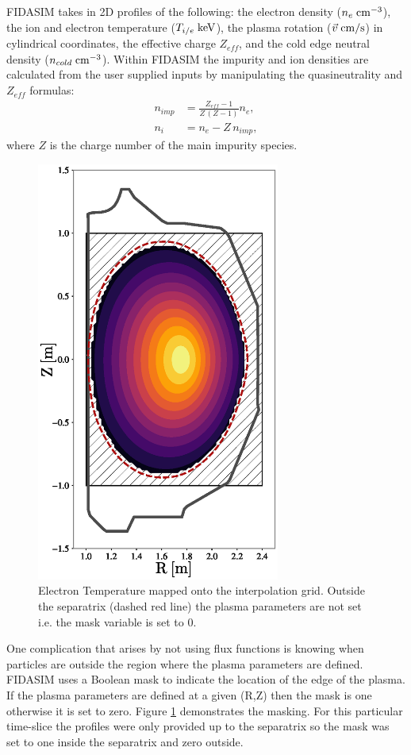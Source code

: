 FIDASIM takes in 2D profiles of the following: the electron density ($n_e\;\rm{cm^{-3}}$), the ion and electron temperature ($T_{i/e}\;\rm{keV}$), the plasma rotation ($\vec{v}\;\rm{cm/s}$) in cylindrical coordinates, the effective charge $Z_{eff}$, and the cold edge neutral density ($n_{cold}\;\rm{cm^{-3}}$). Within FIDASIM the impurity and ion densities are calculated from the user supplied inputs by manipulating the quasineutrality and $Z_{eff}$ formulas:
\begin{equation}
\begin{split}
    n_{imp} &= \frac{Z_{eff} - 1}{Z\,(Z-1)} n_e, \\
    n_i &= n_e - Z\,n_{imp},
\end{split}
\end{equation}
where $Z$ is the charge number of the main impurity species.
\begin{figure}[h!]
    \centering
    \includegraphics[width=8cm]{figures/te_cross_section.eps}
    \caption{Electron Temperature mapped onto the interpolation grid. Outside the separatrix (dashed red line) the plasma parameters are not set i.e. the mask variable is set to 0.}
    \label{fig:te_mask}
\end{figure}
One complication that arises by not using flux functions is knowing when particles are outside the region where the plasma parameters are defined. FIDASIM uses a Boolean mask to indicate the location of the edge of the plasma. If the plasma parameters are defined at a given (R,Z) then the mask is one otherwise it is set to zero. Figure \ref{fig:te_mask} demonstrates the masking. For this particular time-slice the profiles were only provided up to the separatrix so the mask was set to one inside the separatrix and zero outside.

